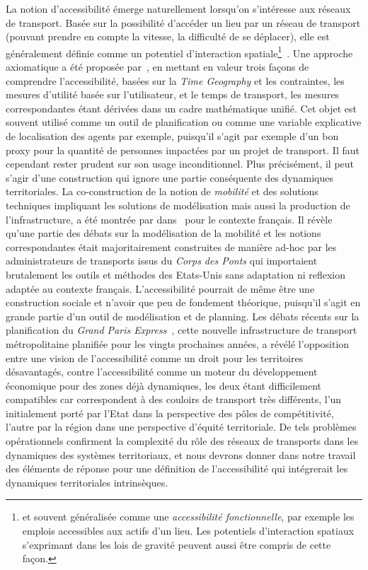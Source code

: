 {}{
La notion d'accessibilité émerge naturellement lorsqu'on s'intéresse aux réseaux de transport. Basée sur la possibilité d'accéder un lieu par un réseau de transport (pouvant prendre en compte la vitesse, la difficulté de se déplacer), elle est généralement définie comme un potentiel d'interaction spatiale\footnote{et souvent généralisée comme une \emph{accessibilité fonctionnelle}, par exemple les emplois accessibles aux actifs d'un lieu. Les potentiels d'interaction spatiaux s'exprimant dans les lois de gravité peuvent aussi être compris de cette façon.}~\cite{bavoux2005geographie}. Une approche axiomatique a été proposée par~\cite{miller1999measuring}, en mettant en valeur trois façons de comprendre l'accessibilité, basées sur la \emph{Time Geography} et les contraintes, les mesures d'utilité basée sur l'utilisateur, et le temps de transport, les mesures correspondantes étant dérivées dans un cadre mathématique unifié. Cet objet est souvent utilisé comme un outil de planification ou comme une variable explicative de localisation des agents par exemple, puisqu'il s'agit par exemple d'un bon proxy pour la quantité de personnes impactées par un projet de transport. Il faut cependant rester prudent sur son usage inconditionnel. Plus précisément, il peut s'agir d'une construction qui ignore une partie conséquente des dynamiques territoriales. La co-construction de la notion de \emph{mobilité} et des solutions techniques impliquant les solutions de modélisation mais aussi la production de l'infrastructure, a été montrée par  dans~\cite{commenges:tel-00923682} pour le contexte français. Il révèle qu'une partie des débats sur la modélisation de la mobilité et les notions correspondantes était majoritairement construites de manière ad-hoc par les administrateurs de transports issus du \emph{Corps des Ponts} qui importaient brutalement les outils et méthodes des Etats-Unis sans adaptation ni reflexion adaptée au contexte français. L'accessibilité pourrait de même être une construction sociale et n'avoir que peu de fondement théorique, puisqu'il s'agit en grande partie d'un outil de modélisation et de planning. Les débats récents sur la planification du \emph{Grand Paris Express}~\cite{confMangin}, cette nouvelle infrastructure de transport métropolitaine planifiée pour les vingts prochaines années, a révélé l'opposition entre une vision de l'accessibilité comme un droit pour les territoires désavantagés, contre l'accessibilité comme un moteur du développement économique pour des zones déjà dynamiques, les deux étant difficilement compatibles car correspondent à des couloirs de transport très différents, l'un initialement porté par l'Etat dans la perspective des pôles de compétitivité, l'autre par la région dans une perspective d'équité territoriale. De tels problèmes opérationnels confirment la complexité du rôle des réseaux de transports dans les dynamiques des systèmes territoriaux, et nous devrons donner dans notre travail des éléments de réponse pour une définition de l'accessibilité qui intégrerait les dynamiques territoriales intrinsèques.
}

